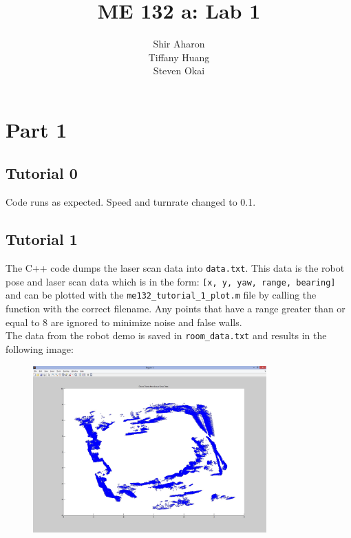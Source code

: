 \documentclass[10pt, titlepage, onecolumn, fleqn]{article}
\title{ME 132 a: Lab 1}
\author{Shir Aharon\\Tiffany Huang\\Steven Okai}
\begin{document}
\maketitle

\section{Part 1}

\subsection{Tutorial 0}
Code runs as expected. Speed and turnrate changed to 0.1.

\subsection{Tutorial 1}
The C++ code dumps the laser scan data into \verb|data.txt|. This data is the robot pose and laser scan data which is in the form: \verb|[x, y, yaw, range, bearing]| and can be plotted with the \verb|me132_tutorial_1_plot.m| file by calling the function with the correct filename. Any points that have a range greater than or equal to 8 are ignored to minimize noise and false walls.\\
The data from the robot demo is saved in \verb|room_data.txt| and results in the following image:
\begin{figure}[H]
\begin{center} \includegraphics[width=0.8\textwidth]{lab01/lab01_material/part1/me132_tutorial_player/Room.jpg} \end{center} \label{tut1}
\end{figure}
\end{document}
